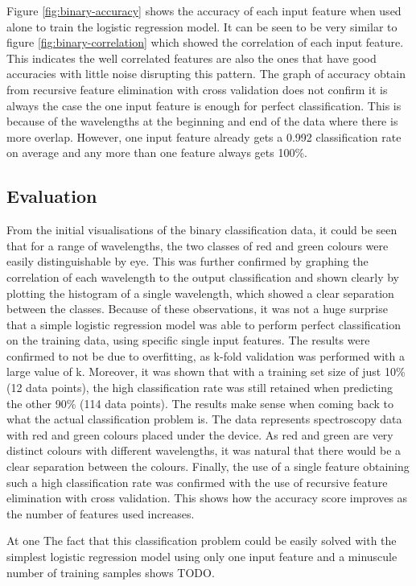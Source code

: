\documentclass{article}
\begin{document}
\noindent
Figure \ref{fig:binary-accuracy} shows the accuracy of each input feature when used alone to train the logistic regression model. It can be seen to be very similar to figure \ref{fig:binary-correlation} which showed the correlation of each input feature. This indicates the well correlated features are also the ones that have good accuracies with little noise disrupting this pattern. The graph of accuracy obtain from recursive feature elimination with cross validation does not confirm it is always the case the one input feature is enough for perfect classification. This is because of the wavelengths at the beginning and end of the data where there is more overlap. However, one input feature already gets a 0.992 classification rate on average and any more than one feature always gets 100\%. 

\subsection{Evaluation}
From the initial visualisations of the binary classification data, it could be seen that for a range of wavelengths, the two classes of red and green colours were easily distinguishable by eye. This was further confirmed by graphing the correlation of each wavelength to the output classification and shown clearly by plotting the histogram of a single wavelength, which showed a clear separation between the classes. Because of these observations, it was not a huge surprise that a simple logistic regression model was able to perform perfect classification on the training data, using specific single input features. The results were confirmed to not be due to overfitting, as k-fold validation was performed with a large value of k. Moreover, it was shown that with a training set size of just 10\% (12 data points), the high classification rate was still retained when predicting the other 90\% (114 data points).
\n
The results make sense when coming back to what the actual classification problem is. The data represents spectroscopy data with red and green colours placed under the device. As red and green are very distinct colours with different wavelengths, it was natural that there would be a clear separation between the colours.
\n
Finally, the use of a single feature obtaining such a high classification rate was confirmed with the use of recursive feature elimination with cross validation. This shows how the accuracy score improves as the number of features used increases.

At one 
The fact that this classification problem could be easily solved with the simplest logistic regression model using only one input feature and a minuscule number of training samples shows TODO. 
\end{document}

